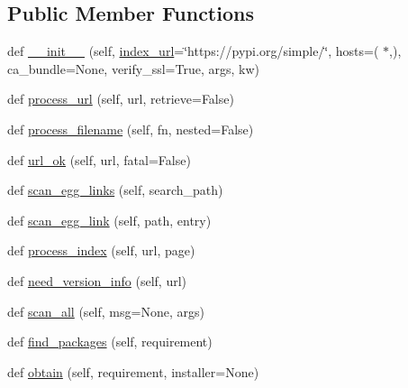 \subsection*{Public Member Functions}
\begin{DoxyCompactItemize}
\item 
def \hyperlink{classsetuptools_1_1package__index_1_1PackageIndex_ac7be93ac686f243570e0631069e2c7d6}{\+\_\+\+\_\+init\+\_\+\+\_\+} (self, \hyperlink{classsetuptools_1_1package__index_1_1PackageIndex_a880d354bb91944645d4a722ca09a882a}{index\+\_\+url}=\char`\"{}https\+://pypi.\+org/simple/\char`\"{}, hosts=(\textquotesingle{} $\ast$\textquotesingle{},), ca\+\_\+bundle=None, verify\+\_\+ssl=True, args, kw)
\item 
def \hyperlink{classsetuptools_1_1package__index_1_1PackageIndex_a537fc87df159c2474b7fa0ccac56513d}{process\+\_\+url} (self, url, retrieve=False)
\item 
def \hyperlink{classsetuptools_1_1package__index_1_1PackageIndex_ac83aebaf268b16debbfb5fd6200c53f7}{process\+\_\+filename} (self, fn, nested=False)
\item 
def \hyperlink{classsetuptools_1_1package__index_1_1PackageIndex_a6d4244e6fcdf1ba83a958d28fb631756}{url\+\_\+ok} (self, url, fatal=False)
\item 
def \hyperlink{classsetuptools_1_1package__index_1_1PackageIndex_a50e6e468950479ac9902c899435c0483}{scan\+\_\+egg\+\_\+links} (self, search\+\_\+path)
\item 
def \hyperlink{classsetuptools_1_1package__index_1_1PackageIndex_ae65aee19ddf23d6602bcd09fd3f060a7}{scan\+\_\+egg\+\_\+link} (self, path, entry)
\item 
def \hyperlink{classsetuptools_1_1package__index_1_1PackageIndex_a1ae14e5edd4b4c1a585aec3eb9022de0}{process\+\_\+index} (self, url, page)
\item 
def \hyperlink{classsetuptools_1_1package__index_1_1PackageIndex_af387b1796d6cf3a4542782cf936ee854}{need\+\_\+version\+\_\+info} (self, url)
\item 
def \hyperlink{classsetuptools_1_1package__index_1_1PackageIndex_ae2e367f0243bea335a9fb9a86f77a668}{scan\+\_\+all} (self, msg=None, args)
\item 
def \hyperlink{classsetuptools_1_1package__index_1_1PackageIndex_ac6b53cacdec1d717c42a4412cb0bc10f}{find\+\_\+packages} (self, requirement)
\item 
def \hyperlink{classsetuptools_1_1package__index_1_1PackageIndex_aefcf6b14d54c909ce0200f666672acaf}{obtain} (self, requirement, installer=None)

\end{DoxyCompactItemize}

